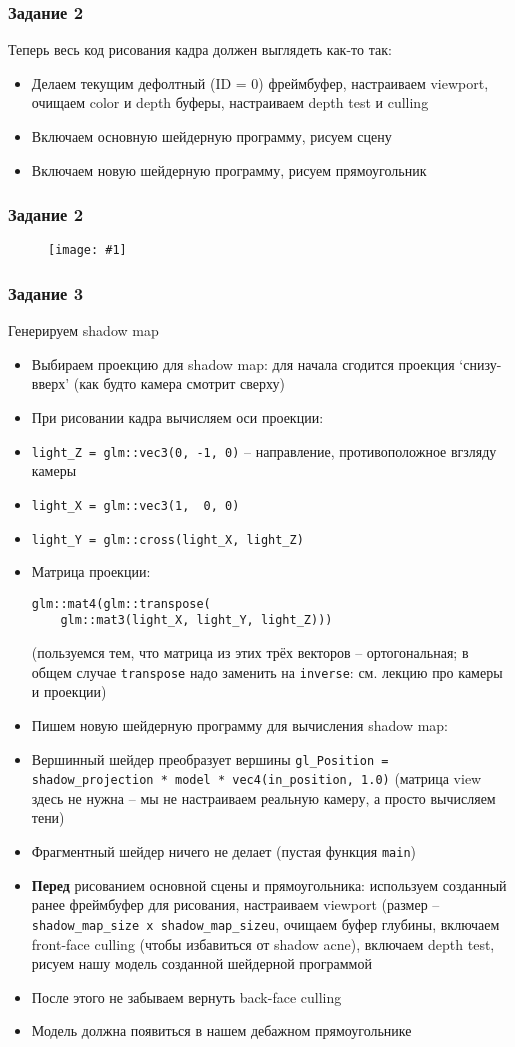\documentclass{beamer}
\newcommand{\slideimage}[1]{
  \begin{figure}
    \begin{adjustbox}{width=\textwidth, totalheight=\textheight-2\baselineskip-2\baselineskip,keepaspectratio}
      \texttt{[image: \#1]}
    \end{adjustbox}
  \end{figure}
}
\begin{document}
\begin{frame}[fragile]
\frametitle{Задание 2}
Теперь весь код рисования кадра должен выглядеть как-то так:
\begin{itemize}
\item Делаем текущим дефолтный (ID = 0) фреймбуфер, настраиваем viewport, очищаем color и depth буферы, настраиваем depth test и culling
\item Включаем основную шейдерную программу, рисуем сцену
\item Включаем новую шейдерную программу, рисуем прямоугольник
\end{itemize}
\end{frame}

\begin{frame}[fragile]
\frametitle{Задание 2}
\slideimage{2.png}
\end{frame}

\begin{frame}[fragile]
\frametitle{Задание 3}
\begin{tiny}
Генерируем shadow map
\begin{itemize}
\item Выбираем проекцию для shadow map: для начала сгодится проекция `снизу-вверх' (как будто камера смотрит сверху)
\item При рисовании кадра вычисляем оси проекции:
\item \verb|light_Z = glm::vec3(0, -1, 0)| -- направление, противоположное вгзляду камеры
\item \verb|light_X = glm::vec3(1,  0, 0)|
\item \verb|light_Y = glm::cross(light_X, light_Z)|
\item Матрица проекции: \begin{verbatim}glm::mat4(glm::transpose(
    glm::mat3(light_X, light_Y, light_Z)))\end{verbatim} (пользуемся тем, что матрица из этих трёх векторов -- ортогональная; в общем случае \verb|transpose| надо заменить на \verb|inverse|: см. лекцию про камеры и проекции)
\item Пишем новую шейдерную программу для вычисления shadow map:
\item Вершинный шейдер преобразует вершины \verb|gl_Position = shadow_projection * model * vec4(in_position, 1.0)| (матрица view здесь не нужна -- мы не настраиваем реальную камеру, а просто вычисляем тени)
\item Фрагментный шейдер ничего не делает (пустая функция \verb|main|)
\item \textbf{Перед} рисованием основной сцены и прямоугольника: используем созданный ранее фреймбуфер для рисования, настраиваем viewport (размер -- \verb|shadow_map_size x shadow_map_sizeu|, очищаем буфер глубины, включаем front-face culling (чтобы избавиться от shadow acne), включаем depth test, рисуем нашу модель созданной шейдерной программой
\item После этого не забываем вернуть back-face culling
\item Модель должна появиться в нашем дебажном прямоугольнике
\end{itemize}
\end{tiny}
\end{frame}
\end{document}
